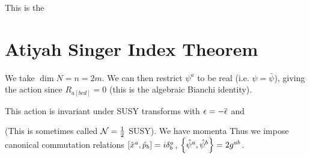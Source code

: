 \documentclass{article}
\begin{document}
This is the 

\section{Atiyah Singer Index Theorem}
We take $\dim N = n = 2m$. We can then restrict $\psi^a$ to be real (i.e. $\psi= \bar{\psi}$), giving the action
since $R_{a[bcd]}=0$ (this is the algebraic Bianchi identity). 
\begin{prop}
This action is invariant under SUSY transforms with $ \eps = - \bar{\eps}$ and 
\end{prop}
(This is sometimes called $\mc{N}=\frac{1}{2}$ SUSY). We have momenta 
Thus we impose canonical commutation relations $\comm[\hat{x}^a]{\hat{p}_b} = i \delta^a_b$, $\acomm[\hat{\psi}^a]{\hat{\psi}^b} = 2g^{ab}$. 


\end{document}
